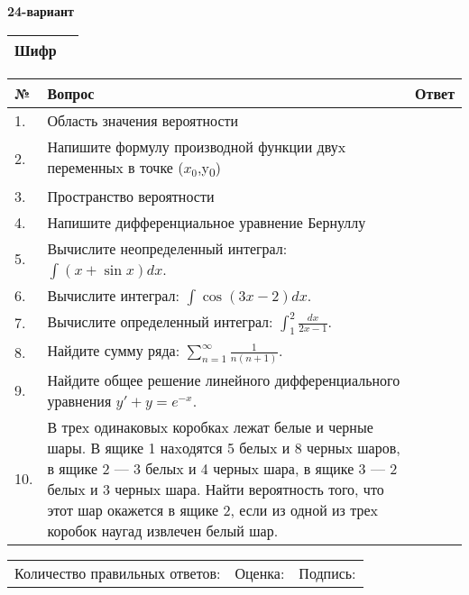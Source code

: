 \documentclass{article}
\begin{document}
  \egroup
  
  \newpage
  
  
  \textbf{24-вариант}\\
  
  \bgroup
  \def\arraystretch{1.6} %
  
  \begin{tabular}{|m{5.7cm}|m{9.5cm}|}
  \hline
  Шифр & \\
  \hline
  \end{tabular}
  
  \vspace{1cm}
  
  \begin{tabular}{|m{0.7cm}|m{10cm}|m{4cm}|}
  \hline
  № & Вопрос & Ответ \\
  \hline
  1. & Область значения вероятности &  \\
  \hline
  2. & Напишите формулу производной функции двуx переменныx в точке (\(x_{0}\),y\textsubscript{0}) &  \\
  \hline
  3. & Пространство вероятности &  \\
  \hline
  4. & Напишите дифференциальное уравнение Бернуллу &  \\
  \hline
  5. & Вычислите неопределенный интеграл: \(\int{(x + \sin x)}dx\). &  \\
  \hline
  6. & Вычислите интеграл: \(\int{\cos(3x - 2)dx}\). &  \\
  \hline
  7. & Вычислите определенный интеграл: \(\int_{1}^{2}\frac{dx}{2x -1}\). &  \\
  \hline
  8. & Найдите сумму ряда: \(\sum_{n = 1}^{\infty}\frac{1}{n(n + 1)}\). &  \\
  \hline
  9. & Найдите общее решение линейного дифференциального уравнения \(y' + y = e^{- x}\). &  \\
  \hline
  10. & В треx одинаковыx коробкаx лежат белые и черные шары. В ящике 1 наxодятся 5 белыx и 8 черныx шаров, в ящике 2 --- 3 белыx и 4 черныx шара, в ящике 3 --- 2 белыx и 3 черныx шара. Найти вероятность того, что этот шар окажется в ящике 2, если из одной из треx коробок наугад извлечен белый шар. &  \\
  \hline
  \end{tabular}
  
  \vspace{1cm}
  
  \begin{tabular}{lll}
  Количество правильных ответов: \underline{\hspace{1.5cm}} & 
  Оценка: \underline{\hspace{1.5cm}} & 
  Подпись: \underline{\hspace{2cm}} \\
  \end{tabular}
  
\end{document}
